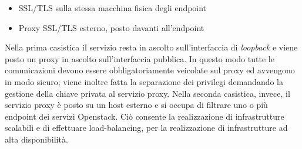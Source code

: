\documentclass[../main.tex]{subfiles}
\begin{document}
\begin{itemize}
\item SSL/TLS sulla stessa macchina fisica degli endpoint
\begin{figure}[H]
\centering
{}
\caption*[Proxy SSL/TLS sulla stessa macchina fisica \cite{OpenStackSecurity}]{}\label{SSLPhys}
\end{figure}


\item Proxy SSL/TLS esterno, posto davanti all'endpoint
\begin{figure}[H]
\centering
{}
\caption*[Proxy SSL/TLS esterno \cite{OpenStackSecurity}]{}\label{SSLInFront}
\end{figure}
\end{itemize}

Nella prima casistica il servizio resta in ascolto sull'interfaccia di \textit{loopback} e viene posto un proxy in ascolto sull'interfaccia pubblica. In questo modo tutte le comunicazioni devono essere obbligatoriamente veicolate sul proxy ed avvengono in modo sicuro; viene inoltre fatta la separazione dei privilegi demandando la gestione della chiave privata al servizio proxy.
Nella seconda casistica, invece, il servizio proxy è posto su un host esterno e si occupa di filtrare uno o più endpoint dei servizi Openstack. Ciò consente la realizzazione di infrastrutture scalabili e di effettuare load-balancing, per la realizzazione di infrastrutture ad alta disponibilità.
\end{document}
